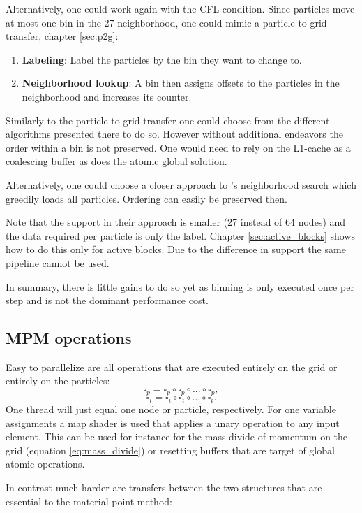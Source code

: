 \documentclass[m,times]{cgMA}
\begin{document}
Alternatively, one could work again with the CFL condition. Since particles move at most one bin in the 27-neighborhood, one could mimic a particle-to-grid-transfer, chapter \ref{sec:p2g}:
\begin{enumerate}
  \item \textbf{Labeling}: Label the particles by the bin they want to change to.
  \item \textbf{Neighborhood lookup}: A bin then assigns offsets to the particles in the neighborhood and increases its counter.
\end{enumerate}
Similarly to the particle-to-grid-transfer one could choose from the different algorithms presented there to do so. However without additional endeavors the order within a bin is not preserved. One would need to rely on the L1-cache as a coalescing buffer as does the atomic global solution.

Alternatively, one could choose a closer approach to \cite{NVIDIA:NNSEARCH}'s neighborhood search which greedily loads all particles. Ordering can easily be preserved then.

Note that the support in their approach is smaller (27 instead of 64 nodes) and the data required per particle is only the label. Chapter \ref{sec:active_blocks} shows how to do this only for active blocks. Due to the difference in support the same pipeline cannot be used.

In summary, there is little gains to do so yet as binning is only executed once per step and is not the dominant performance cost.

\subsection{MPM operations}\label{sec:transfers}
Easy to parallelize are all operations that are executed entirely on the grid or entirely on the particles:
$$\square_p = \square_p \circ \square_p \circ ... \circ \square_p,$$
$$\square_i = \square_i \circ \square_i \circ ... \circ \square_i.$$
One thread will just equal one node or particle, respectively. For one variable assignments a map shader is used that applies a unary operation to any input element. This can be used for instance for the mass divide of momentum on the grid (equation \ref{eq:mass_divide}) or resetting buffers that are target of global atomic operations.

In contrast much harder are transfers between the two structures that are essential to the material point method:
\end{document}
